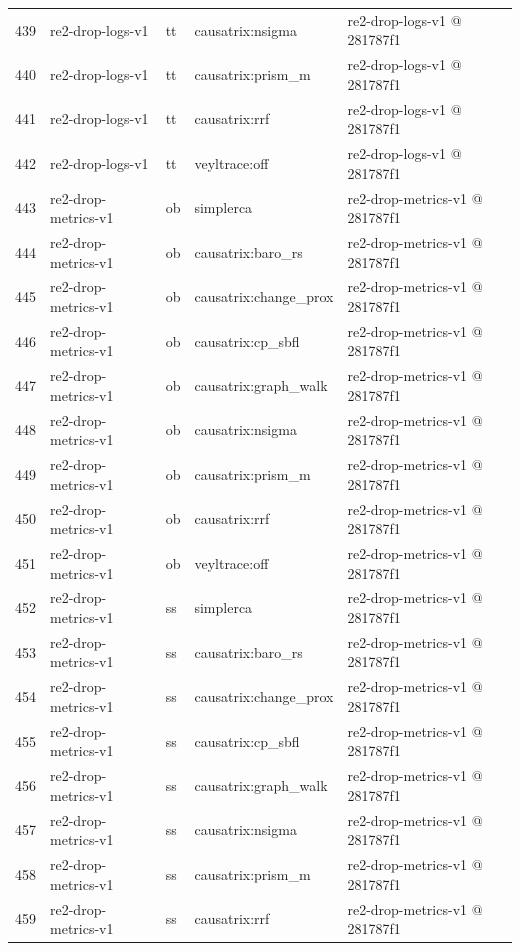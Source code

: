 \begin{longtable}{@{}r>{\raggedright\arraybackslash}p{87.0pt}>{\raggedright\arraybackslash}p{18.0pt}>{\raggedright\arraybackslash}p{63.0pt}>{\raggedright\arraybackslash}p{108.0pt}@{}}
439 & re2-drop-logs-v1 & tt & causatrix:nsigma & re2-drop-logs-v1 @ 281787f1 \\
440 & re2-drop-logs-v1 & tt & causatrix:prism\_m & re2-drop-logs-v1 @ 281787f1 \\
441 & re2-drop-logs-v1 & tt & causatrix:rrf & re2-drop-logs-v1 @ 281787f1 \\
442 & re2-drop-logs-v1 & tt & veyltrace:off & re2-drop-logs-v1 @ 281787f1 \\
443 & re2-drop-metrics-v1 & ob & simplerca & re2-drop-metrics-v1 @ 281787f1 \\
444 & re2-drop-metrics-v1 & ob & causatrix:baro\_rs & re2-drop-metrics-v1 @ 281787f1 \\
445 & re2-drop-metrics-v1 & ob & causatrix:change\_prox & re2-drop-metrics-v1 @ 281787f1 \\
446 & re2-drop-metrics-v1 & ob & causatrix:cp\_sbfl & re2-drop-metrics-v1 @ 281787f1 \\
447 & re2-drop-metrics-v1 & ob & causatrix:graph\_walk & re2-drop-metrics-v1 @ 281787f1 \\
448 & re2-drop-metrics-v1 & ob & causatrix:nsigma & re2-drop-metrics-v1 @ 281787f1 \\
449 & re2-drop-metrics-v1 & ob & causatrix:prism\_m & re2-drop-metrics-v1 @ 281787f1 \\
450 & re2-drop-metrics-v1 & ob & causatrix:rrf & re2-drop-metrics-v1 @ 281787f1 \\
451 & re2-drop-metrics-v1 & ob & veyltrace:off & re2-drop-metrics-v1 @ 281787f1 \\
452 & re2-drop-metrics-v1 & ss & simplerca & re2-drop-metrics-v1 @ 281787f1 \\
453 & re2-drop-metrics-v1 & ss & causatrix:baro\_rs & re2-drop-metrics-v1 @ 281787f1 \\
454 & re2-drop-metrics-v1 & ss & causatrix:change\_prox & re2-drop-metrics-v1 @ 281787f1 \\
455 & re2-drop-metrics-v1 & ss & causatrix:cp\_sbfl & re2-drop-metrics-v1 @ 281787f1 \\
456 & re2-drop-metrics-v1 & ss & causatrix:graph\_walk & re2-drop-metrics-v1 @ 281787f1 \\
457 & re2-drop-metrics-v1 & ss & causatrix:nsigma & re2-drop-metrics-v1 @ 281787f1 \\
458 & re2-drop-metrics-v1 & ss & causatrix:prism\_m & re2-drop-metrics-v1 @ 281787f1 \\
459 & re2-drop-metrics-v1 & ss & causatrix:rrf & re2-drop-metrics-v1 @ 281787f1 \\

\end{longtable}
